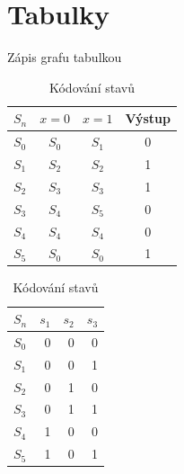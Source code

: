 \section{Tabulky}
\begin{table}[!h]
\begin{minipage}{.5\linewidth}
      \caption{Zápis grafu tabulkou}
      \centering
        \begin{tabular}{l|ccc}
    $S_n$   &  $x=0$  & $x=1$  & \multicolumn{1}{l}{Výstup} \\
    \hline
    $S_0$    & $S_0$    & $S_1$    & 0 \\
    $S_1$    & $S_2$    & $S_2$    & 1 \\
    $S_2$    & $S_3$    & $S_3$    & 1 \\
    $S_3$    & $S_4$    & $S_5$    & 0 \\
    $S_4$    & $S_4$    & $S_4$    & 0 \\
    $S_5$    & $S_0$    & $S_0$    & 1 \\
    \end{tabular}%
    \end{minipage}%
    \begin{minipage}{.5\linewidth}
      \centering
        \caption{Kódování stavů}
         \begin{tabular}{l|rrr}
    $S_n$    & $s_1$ & $s_2$ & $s_3$ \\
        \hline
    $S_0$    & 0     & 0     & 0 \\
    $S_1$   & 0     & 0     & 1 \\
    $S_2$    & 0     & 1     & 0 \\
    $S_3$   & 0     & 1     & 1 \\
    $S_4$   & 1     & 0     & 0 \\
    $S_5$    & 1     & 0     & 1 \\
    \end{tabular}%

    \end{minipage} 

   
  \label{tab:addlabel}%
\end{table}%

